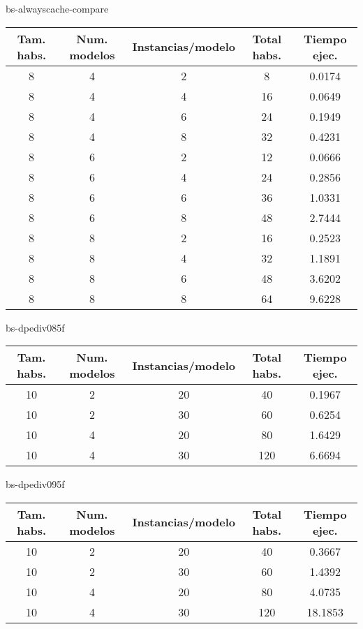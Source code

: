 bs-alwayscache-compare
\begin{center}
	\begin{tabular}{ | c | c | c | c | c | }
\hline
Tam. habs. & Num. modelos & Instancias/modelo & Total habs. & Tiempo ejec. \\ \hline 
8 & 4 & 2 & 8 & 0.0174 \\ 
8 & 4 & 4 & 16 & 0.0649 \\ 
8 & 4 & 6 & 24 & 0.1949 \\ 
8 & 4 & 8 & 32 & 0.4231 \\ 
8 & 6 & 2 & 12 & 0.0666 \\ 
8 & 6 & 4 & 24 & 0.2856 \\ 
8 & 6 & 6 & 36 & 1.0331 \\ 
8 & 6 & 8 & 48 & 2.7444 \\ 
8 & 8 & 2 & 16 & 0.2523 \\ 
8 & 8 & 4 & 32 & 1.1891 \\ 
8 & 8 & 6 & 48 & 3.6202 \\ 
8 & 8 & 8 & 64 & 9.6228 \\ 
\hline
	\end{tabular}
\end{center}

bs-dpediv085f
\begin{center}
	\begin{tabular}{ | c | c | c | c | c | }
\hline
Tam. habs. & Num. modelos & Instancias/modelo & Total habs. & Tiempo ejec. \\ \hline 
10 & 2 & 20 & 40 & 0.1967 \\ 
10 & 2 & 30 & 60 & 0.6254 \\ 
10 & 4 & 20 & 80 & 1.6429 \\ 
10 & 4 & 30 & 120 & 6.6694 \\ 
\hline
	\end{tabular}
\end{center}

bs-dpediv095f
\begin{center}
	\begin{tabular}{ | c | c | c | c | c | }
\hline
Tam. habs. & Num. modelos & Instancias/modelo & Total habs. & Tiempo ejec. \\ \hline 
10 & 2 & 20 & 40 & 0.3667 \\ 
10 & 2 & 30 & 60 & 1.4392 \\ 
10 & 4 & 20 & 80 & 4.0735 \\ 
10 & 4 & 30 & 120 & 18.1853 \\ 
\hline
	\end{tabular}
\end{center}

